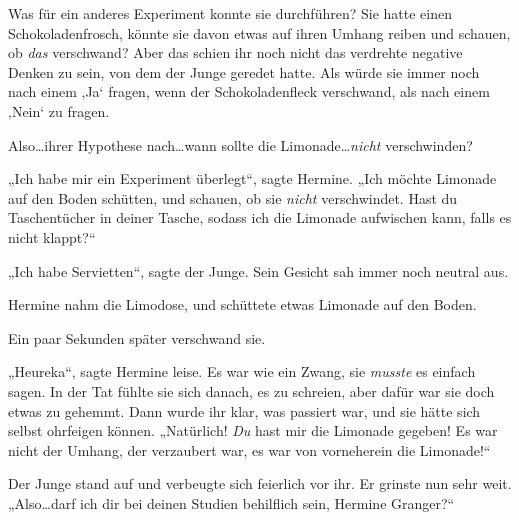 Was für ein anderes Experiment konnte sie durchführen? Sie hatte einen Schokoladenfrosch, könnte sie davon etwas auf ihren Umhang reiben und schauen, ob \emph{das} verschwand? Aber das schien ihr noch nicht das verdrehte negative Denken zu sein, von dem der Junge geredet hatte. Als würde sie immer noch nach einem ‚Ja‘ fragen, wenn der Schokoladenfleck verschwand, als nach einem ‚Nein‘ zu fragen.

Also…ihrer Hypothese nach…wann sollte die Limonade…\emph{nicht} verschwinden?

„Ich habe mir ein Experiment überlegt“, sagte Hermine. „Ich möchte Limonade auf den Boden schütten, und schauen, ob sie \emph{nicht} verschwindet. Hast du Taschentücher in deiner Tasche, sodass ich die Limonade aufwischen kann, falls es nicht klappt?“

„Ich habe Servietten“, sagte der Junge. Sein Gesicht sah immer noch neutral aus.

Hermine nahm die Limodose, und schüttete etwas Limonade auf den Boden.

Ein paar Sekunden später verschwand sie.

„Heureka“, sagte Hermine leise. Es war wie ein Zwang, sie \emph{musste} es einfach sagen. In der Tat fühlte sie sich danach, es zu schreien, aber dafür war sie doch etwas zu gehemmt. Dann wurde ihr klar, was passiert war, und sie hätte sich selbst ohrfeigen können. „Natürlich! \emph{Du} hast mir die Limonade gegeben! Es war nicht der Umhang, der verzaubert war, es war von vorneherein die Limonade!“

Der Junge stand auf und verbeugte sich feierlich vor ihr. Er grinste nun sehr weit. „Also…darf ich dir bei deinen Studien behilflich sein, Hermine Granger?“

